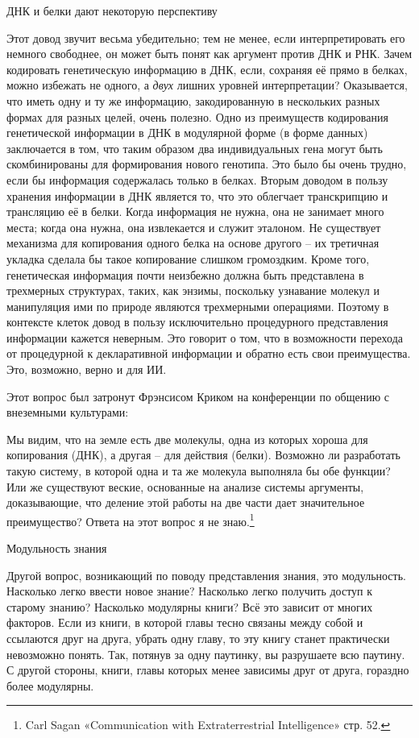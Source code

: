 \documentclass[../main.tex]{subfiles}
\begin{document}
ДНК и белки дают некоторую перспективу

Этот довод звучит весьма убедительно; тем не менее, если интерпретировать его немного свободнее, он может быть понят как аргумент против ДНК и РНК\@. Зачем кодировать генетическую информацию в ДНК, если, сохраняя её прямо в белках, можно избежать не одного, а \emph{двух} лишних уровней интерпретации? Оказывается, что иметь одну и ту же информацию, закодированную в нескольких разных формах для разных целей, очень полезно. Одно из преимуществ кодирования генетической информации в ДНК в модулярной форме (в форме данных) заключается в том, что таким образом два индивидуальных гена могут быть скомбинированы для формирования нового генотипа. Это было бы очень трудно, если бы информация содержалась только в белках. Вторым доводом в пользу хранения информации в ДНК является то, что это облегчает транскрипцию и трансляцию её в белки. Когда информация не нужна, она не занимает много места; когда она нужна, она извлекается и служит эталоном. Не существует механизма для копирования одного белка на основе другого \--- их третичная укладка сделала бы такое копирование слишком громоздким. Кроме того, генетическая информация почти неизбежно должна быть представлена в трехмерных структурах, таких, как энзимы, поскольку узнавание молекул и манипуляция ими по природе являются трехмерными операциями. Поэтому в контексте клеток довод в пользу исключительно процедурного представления информации кажется неверным. Это говорит о том, что в возможности перехода от процедурной к декларативной информации и обратно есть свои преимущества. Это, возможно, верно и для ИИ.

Этот вопрос был затронут Фрэнсисом Криком на конференции по общению с внеземными культурами:

Мы видим, что на земле есть две молекулы, одна из которых хороша для копирования (ДНК), а другая \--- для действия (белки). Возможно ли разработать такую систему, в которой одна и та же молекула выполняла бы обе функции? Или же существуют веские, основанные на анализе системы аргументы, доказывающие, что деление этой работы на две части дает значительное преимущество? Ответа на этот вопрос я не знаю.\footnote{Carl Sagan «Communication with Extraterrestrial Intelligence» стр. 52.}

Модульность знания

Другой вопрос, возникающий по поводу представления знания, это модульность. Насколько легко ввести новое знание? Насколько легко получить доступ к старому знанию? Насколько модулярны книги? Всё это зависит от многих факторов. Если из книги, в которой главы тесно связаны между собой и ссылаются друг на друга, убрать одну главу, то эту книгу станет практически невозможно понять. Так, потянув за одну паутинку, вы разрушаете всю паутину. С другой стороны, книги, главы которых менее зависимы друг от друга, гораздно более модулярны.
\end{document}
